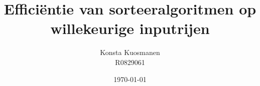 \documentclass[11pt,a4paper]{article}
\title{Efficiëntie van sorteeralgoritmen op willekeurige inputrijen}
\author{Konsta Kuosmanen \\
        R0829061}
\date{\today}
\begin{document}
\maketitle

\pagebreak

\tableofcontents

\pagebreak










\end{document}
